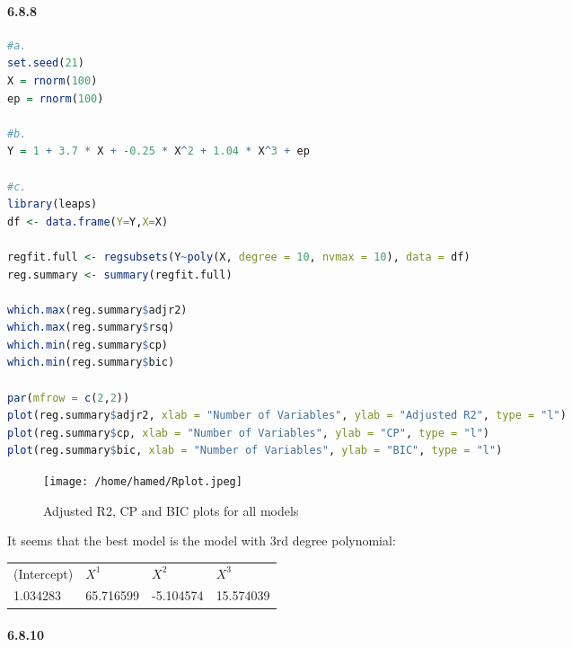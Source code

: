 \documentclass[11pt]{report}
\begin{document}
\paragraph{6.8.8 }
\begin{lstlisting}[language=R, breaklines=true, basicstyle=\ttfamily]
#a.
set.seed(21)
X = rnorm(100)
ep = rnorm(100)

#b.
Y = 1 + 3.7 * X + -0.25 * X^2 + 1.04 * X^3 + ep

#c. 
library(leaps)
df <- data.frame(Y=Y,X=X)

regfit.full <- regsubsets(Y~poly(X, degree = 10, nvmax = 10), data = df)
reg.summary <- summary(regfit.full)

which.max(reg.summary$adjr2)
which.max(reg.summary$rsq)
which.min(reg.summary$cp)
which.min(reg.summary$bic)

par(mfrow = c(2,2))
plot(reg.summary$adjr2, xlab = "Number of Variables", ylab = "Adjusted R2", type = "l")
plot(reg.summary$cp, xlab = "Number of Variables", ylab = "CP", type = "l")
plot(reg.summary$bic, xlab = "Number of Variables", ylab = "BIC", type = "l")

\end{lstlisting}
\begin{figure}[htp]
\centering
\texttt{[image: /home/hamed/Rplot.jpeg]}
\caption{Adjusted R2, CP and BIC plots for all models}
\label{}
\end{figure}
It seems that the best model is the model with 3rd degree polynomial:
\begin{tabular}{llll}
(Intercept) & $X^1$ & $X^2$ & $X^3$ \\
1.034283 & 65.716599 & -5.104574 & 15.574039 \\
\end{tabular}                     

\paragraph{6.8.10 }
\end{document}
